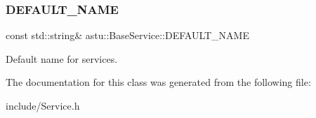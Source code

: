 \subsubsection{\texorpdfstring{D\+E\+F\+A\+U\+L\+T\+\_\+\+N\+A\+ME}{DEFAULT\_NAME}}
{\footnotesize\ttfamily const std\+::string\& astu\+::\+Base\+Service\+::\+D\+E\+F\+A\+U\+L\+T\+\_\+\+N\+A\+ME\hspace{0.3cm}{\ttfamily [static]}}

Default name for services. 

The documentation for this class was generated from the following file\+:\begin{DoxyCompactItemize}
\item 
include/Service.\+h\end{DoxyCompactItemize}

